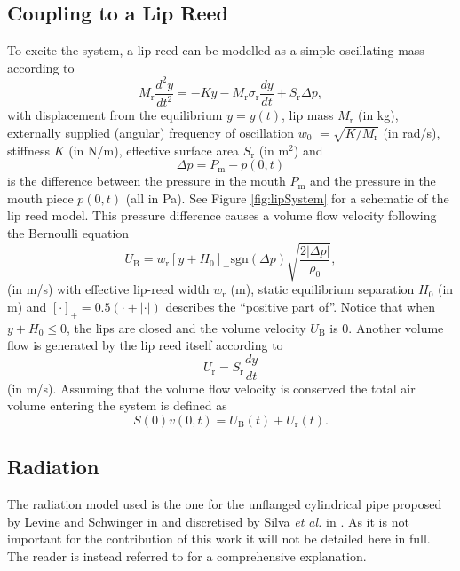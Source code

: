 \subsection{Coupling to a Lip Reed}
To excite the system, a lip reed can be modelled as a simple oscillating mass according to
\begin{equation}
    M_\text{r}\frac{d^2y}{dt^2} = -K y - M_\text{r} \sigma_\text{r} \frac{dy}{dt} + S_\text{r}\Delta p,
\end{equation}
with displacement from the equilibrium $y = y(t)$, lip mass $M_\text{r}$ (in kg), externally supplied (angular) frequency of oscillation $w_0$ \SWcomment[$= w_0(t)$] $= \sqrt{K/M_\text{r}}$ (in rad/s), stiffness $K$ \SWcomment[$= K(t)$] (in N/m), effective surface area $S_\text{r}$ (in m$^2$) and 
\begin{equation}
    \Delta p = P_\text{m} - p(0,t)
\end{equation}
is the difference between the pressure in the mouth $P_\text{m}$ and the pressure in the mouth piece $p(0, t)$ (all in Pa). See Figure \ref{fig:lipSystem} for a schematic of the lip reed model. 
This pressure difference causes a volume flow velocity following the Bernoulli equation
\begin{equation}
    U_\text{B} = w_\text{r}[y + H_0]_+\text{sgn}(\Delta p) \sqrt{\frac{2|\Delta p|}{\rho_0}},
\end{equation}
(in m/s) with effective lip-reed width $w_\text{r}$ (m), static equilibrium separation $H_0$ (in m) and $[\cdot]_+ = 0.5 (\cdot + |\cdot|)$ describes the ``positive part of''. Notice that when $y + H_0 \leq 0$, the lips are closed and the volume velocity $U_\text{B}$ is 0. Another volume flow is generated by the lip reed itself according to
\begin{equation}
    U_\text{r} = S_\text{r} \frac{dy}{dt}
\end{equation}
(in m/s).
Assuming that the volume flow velocity is conserved the total air volume entering the system is defined as
\begin{equation}
    S(0)v(0,t) = U_\text{B}(t) + U_\text{r}(t).
\end{equation}




\subsection{Radiation}
The radiation model used is the one for the unflanged cylindrical pipe proposed by Levine and Schwinger in \cite{Levine1948} and discretised by Silva \emph{et al.} in \cite{Silva2009}. As it is not important for the contribution of this work it will not be detailed here in full. The reader is instead referred to \cite{Harrison2018} for a comprehensive explanation. 